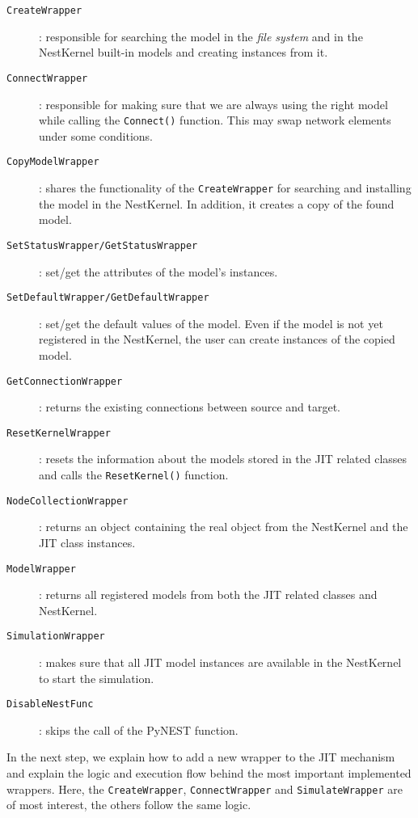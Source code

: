 \begin{description}
   \item[\mdseries\texttt{CreateWrapper}]: responsible for searching the model in the \emph{file system} and in the NestKernel built-in models and creating instances from it.
   \item[\mdseries\texttt{ConnectWrapper}]: responsible for making sure that we are always using the right model while calling the \texttt{Connect()} function. This may swap network elements under some conditions.
   \item[\mdseries\texttt{CopyModelWrapper}]: shares the functionality of the \texttt{CreateWrapper} for searching and installing the model in the NestKernel. In addition, it creates a copy of the found model.
   \item[\mdseries\texttt{SetStatusWrapper{\normalfont/}GetStatusWrapper}]: set/get the attributes of the model's instances.
   \item[\mdseries\texttt{SetDefaultWrapper{\normalfont/}GetDefaultWrapper}]: set/get the default values of the model. Even if the model is not yet registered in the NestKernel, the user can create instances of the copied model.
   \item[\mdseries\texttt{GetConnectionWrapper}]: returns the existing connections between source and target.
   \item[\mdseries\texttt{ResetKernelWrapper}]: resets the information about the models stored in the JIT related classes and calls the \texttt{ResetKernel()} function.
   \item[\mdseries\texttt{NodeCollectionWrapper}]: returns an object containing the real object from the NestKernel and the JIT class instances.
   \item[\mdseries\texttt{ModelWrapper}]: returns all registered models from both the JIT related classes and NestKernel.
   \item[\mdseries\texttt{SimulationWrapper}]: makes sure that all JIT model instances are available in the NestKernel to start the simulation.
   \item[\mdseries\texttt{DisableNestFunc}]: skips the call of the PyNEST function.
\end{description}

   In the next step, we explain how to add a new wrapper to the JIT mechanism and explain the logic and execution flow behind the most important implemented wrappers. Here, the \texttt{CreateWrapper}, \texttt{ConnectWrapper} and \texttt{SimulateWrapper} are of most interest, the others follow the same logic.

